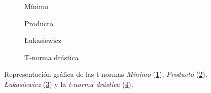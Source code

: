 \begin{figure}[H]
	\centering
	\begin{subfigure}[b]{0.45\textwidth}
		\newlength\figureheight 
		\newlength\figurewidth
		\setlength\figureheight{4.5cm}
		\setlength\figurewidth{6cm}
		
		\caption{Mínimo}
		\label{fig:t-norms-min}
	\end{subfigure}
	\qquad
	\begin{subfigure}[b]{0.45\textwidth}
		\setlength\figureheight{4.5cm}
		\setlength\figurewidth{6cm}
		
		\caption{Producto}
		\label{fig:t-norms-prod}
	\end{subfigure}
	
	\vspace{1 cm}
	\begin{subfigure}[b]{0.45\textwidth}
		\setlength\figureheight{4.5cm}
		\setlength\figurewidth{6cm}
		
		\caption{\L{}ukasiewicz}
		\label{fig:t-norms-lukasiewicz}
	\end{subfigure}
	\qquad
	\begin{subfigure}[b]{0.45\textwidth}
			\setlength\figureheight{4.5cm}
			\setlength\figurewidth{6cm}
			
			\caption{T-norma drástica}
			\label{fig:t-norms-drastic}
	\end{subfigure}
	\label{fig:t-norms}
	\caption{Representación gráfica de las t-normas \emph{Mínimo} (\ref{fig:t-norms-min}), \emph{Producto} (\ref{fig:t-norms-prod}), \emph{\L{}ukasiewicz} (\ref{fig:t-norms-lukasiewicz}) y la \emph{t-norma drástica} (\ref{fig:t-norms-drastic}).}
\end{figure}

